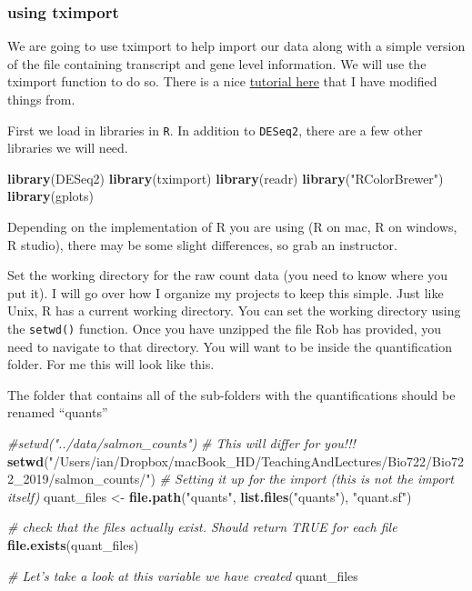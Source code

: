 \documentclass[
]{article}
\newenvironment{Shaded}{\begin{snugshade}}{\end{snugshade}}
\newcommand{\CommentTok}[1]{\textcolor[rgb]{0.56,0.35,0.01}{\textit{#1}}}
\newcommand{\KeywordTok}[1]{\textcolor[rgb]{0.13,0.29,0.53}{\textbf{#1}}}
\newcommand{\NormalTok}[1]{#1}
\newcommand{\StringTok}[1]{\textcolor[rgb]{0.31,0.60,0.02}{#1}}
\begin{document}
\hypertarget{using-tximport}{%
\subsubsection{using tximport}\label{using-tximport}}

We are going to use tximport to help import our data along with a simple
version of the file containing transcript and gene level information. We
will use the tximport function to do so. There is a nice
\href{https://bioconductor.org/packages/devel/bioc/vignettes/tximport/inst/doc/tximport.html}{tutorial
here} that I have modified things from.

First we load in libraries in \texttt{R}. In addition to
\texttt{DESeq2}, there are a few other libraries we will need.

\begin{Shaded}
\begin{Highlighting}[]
\KeywordTok{library}\NormalTok{(DESeq2)}
\KeywordTok{library}\NormalTok{(tximport)}
\KeywordTok{library}\NormalTok{(readr)}
\KeywordTok{library}\NormalTok{(}\StringTok{"RColorBrewer"}\NormalTok{)}
\KeywordTok{library}\NormalTok{(gplots)}
\end{Highlighting}
\end{Shaded}

Depending on the implementation of R you are using (R on mac, R on
windows, R studio), there may be some slight differences, so grab an
instructor.

Set the working directory for the raw count data (you need to know where
you put it). I will go over how I organize my projects to keep this
simple. Just like Unix, R has a current working directory. You can set
the working directory using the \texttt{setwd()} function. Once you have
unzipped the file Rob has provided, you need to navigate to that
directory. You will want to be inside the quantification folder. For me
this will look like this.

The folder that contains all of the sub-folders with the quantifications
should be renamed ``quants''

\begin{Shaded}
\begin{Highlighting}[]
\CommentTok{#setwd("../data/salmon_counts")}
\CommentTok{# This will differ for you!!!}
\KeywordTok{setwd}\NormalTok{(}\StringTok{"/Users/ian/Dropbox/macBook_HD/TeachingAndLectures/Bio722/Bio722_2019/salmon_counts/"}\NormalTok{)}
\CommentTok{# Setting it up for the import (this is not the import itself)}
\NormalTok{quant_files <-}\StringTok{ }\KeywordTok{file.path}\NormalTok{(}\StringTok{"quants"}\NormalTok{, }\KeywordTok{list.files}\NormalTok{(}\StringTok{"quants"}\NormalTok{), }\StringTok{"quant.sf"}\NormalTok{)}


\CommentTok{# check that the files actually exist. Should return TRUE for each file}
\KeywordTok{file.exists}\NormalTok{(quant_files)}

\CommentTok{# Let's take a look at this variable we have created}
\NormalTok{quant_files}
\end{Highlighting}
\end{Shaded}
\end{document}
